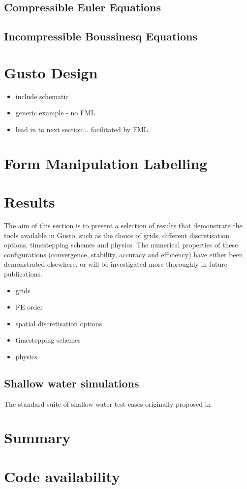 \documentclass[11pt, a4paper]{article}
\begin{document}
\subsection{Compressible Euler Equations}

\subsection{Incompressible Boussinesq Equations}

\section{Gusto Design}

\begin{itemize}
\item include schematic
\item generic example - no FML
\item lead in to next section... facilitated by FML
\end{itemize}

\section{Form Manipulation Labelling}

\section{Results}
The aim of this section is to present a selection of results that
demonstrate the tools available in Gusto, such as the choice of grids,
different discretisation options, timestepping schemes and
physics. The numerical properties of these configurations
(convergence, stability, accuracy and efficiency) have either been
demonstrated elsewhere, or will be investigated more thoroughly in
future publications.

\begin{itemize}
\item grids
\item FE order
\item spatial discretisation options
\item timestepping schemes
\item physics
\end{itemize}

\subsection{Shallow water simulations}
The standard suite of shallow water test cases originally proposed in
\citet{williamson1992standard}



\section{Summary}

\section{Code availability}


\end{document}
